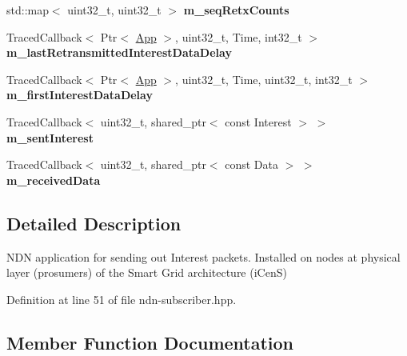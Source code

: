 \begin{DoxyCompactItemize}
\item 
std\+::map$<$ uint32\+\_\+t, uint32\+\_\+t $>$ {\bfseries m\+\_\+seq\+Retx\+Counts}\hypertarget{classns3_1_1ndn_1_1Subscriber_ada864cb826bca471b0593f7e9b41602e}{}\label{classns3_1_1ndn_1_1Subscriber_ada864cb826bca471b0593f7e9b41602e}

\item 
Traced\+Callback$<$ Ptr$<$ \hyperlink{classns3_1_1ndn_1_1App}{App} $>$, uint32\+\_\+t, Time, int32\+\_\+t $>$ {\bfseries m\+\_\+last\+Retransmitted\+Interest\+Data\+Delay}\hypertarget{classns3_1_1ndn_1_1Subscriber_a9567a1960a661a1fadd1bf485316ee89}{}\label{classns3_1_1ndn_1_1Subscriber_a9567a1960a661a1fadd1bf485316ee89}

\item 
Traced\+Callback$<$ Ptr$<$ \hyperlink{classns3_1_1ndn_1_1App}{App} $>$, uint32\+\_\+t, Time, uint32\+\_\+t, int32\+\_\+t $>$ {\bfseries m\+\_\+first\+Interest\+Data\+Delay}\hypertarget{classns3_1_1ndn_1_1Subscriber_a63dbd29971ccfb811ce12a063c02f071}{}\label{classns3_1_1ndn_1_1Subscriber_a63dbd29971ccfb811ce12a063c02f071}

\item 
Traced\+Callback$<$ uint32\+\_\+t, shared\+\_\+ptr$<$ const Interest $>$ $>$ {\bfseries m\+\_\+sent\+Interest}\hypertarget{classns3_1_1ndn_1_1Subscriber_ac6113d109a830bf5ad51999db193ea44}{}\label{classns3_1_1ndn_1_1Subscriber_ac6113d109a830bf5ad51999db193ea44}

\item 
Traced\+Callback$<$ uint32\+\_\+t, shared\+\_\+ptr$<$ const Data $>$ $>$ {\bfseries m\+\_\+received\+Data}\hypertarget{classns3_1_1ndn_1_1Subscriber_a1aac97698bae88bd9707cc84e3764dcd}{}\label{classns3_1_1ndn_1_1Subscriber_a1aac97698bae88bd9707cc84e3764dcd}

\end{DoxyCompactItemize}


\subsection{Detailed Description}
N\+DN application for sending out Interest packets. Installed on nodes at physical layer (prosumers) of the Smart Grid architecture (i\+CenS) 

Definition at line 51 of file ndn-\/subscriber.\+hpp.



\subsection{Member Function Documentation}
